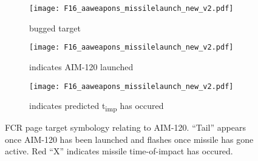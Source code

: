 \begin{figure}[htbp]
    \centering
    \begin{subfigure}[t]{0.3\linewidth}
        \centering
        \texttt{[image: F16\_aaweapons\_missilelaunch\_new\_v2.pdf]}
        \caption{bugged target}
    \end{subfigure}
    \begin{subfigure}[t]{0.3\linewidth}
        \centering
        \texttt{[image: F16\_aaweapons\_missilelaunch\_new\_v2.pdf]}
        \caption{indicates AIM-120 launched}
    \end{subfigure}
    \begin{subfigure}[t]{0.3\linewidth}
        \centering
        \texttt{[image: F16\_aaweapons\_missilelaunch\_new\_v2.pdf]}
        \caption{indicates predicted t\textsubscript{imp} has occured}
    \end{subfigure}
    \caption{
        FCR page target symbology relating to AIM-120. 
        ``Tail'' appears once AIM-120 has been launched and flashes once missile has gone active. 
        Red ``X'' indicates missile time-of-impact has occured.
    }
\end{figure}

\marginfigeometry

